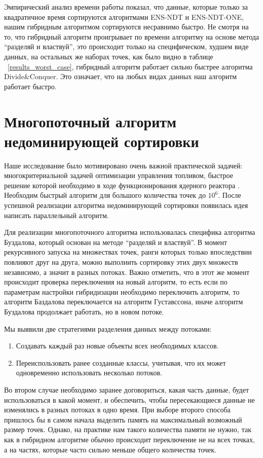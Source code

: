 Эмпирический анализ времени работы показал, что данные, которые только за квадратичное время сортируются алгоритмами ENS-NDT и ENS-NDT-ONE, нашим гибридным алгоритмом сортируются несравнимо быстро. Не смотря на то, что гибридный алгоритм проигрывает по времени алгоритму на основе метода ``разделяй и властвуй'', это происходит только на специфическом, худшем виде данных, на остальных же наборах точек, как было видно в таблице ~\ref{results_worst_case}, гибридный алгоритм работает сильно быстрее алгоритма Divide\&Conquer. Это означает, что на любых видах данных наш алгоритм работает быстро.

\section{Многопоточный алгоритм недоминирующей сортировки}

Наше исследование было мотивировано очень важной практической задачей: многокритериальной задачей оптимизации управления топливом, быстрое решение которой необходимо в ходе функционирования ядерного реактора \cite{Schlunz}. Необходим быстрый алгоритм для большого количества точек до $10^6$. После успешной реализации алгоритма недоминирующей сортировки появилась идея написать параллельный алгоритм. 

Для реализации многопоточного алгоритма использовалась специфика алгоритма Буздалова, который основан на методе ``разделяй и властвуй''.  В момент рекурсивного запуска на множествах точек, ранги которых только впоследствии повлияют друг на друга, можно выполнить сортировку этих двух множеств независимо, а значит в разных потоках. Важно отметить, что в этот же момент происходит проверка переключения на новый алгоритм, то есть если по параметрам настройки гибридизации необходимо переключить алгоритм, то алгоритм Баздалова переключается на алгоритм Густавссона, иначе алгоритм Буздалова продолжает работать, но в новом потоке. 

Мы выявили две стратегиями разделения данных между потоками:
\begin{enumerate}
    \item Создавать каждый раз новые объекты всех необходимых классов.
    \item Переиспользовать ранее созданные классы, учитывая, что их может одновременно использовать несколько потоков.
\end{enumerate}

Во втором случае необходимо заранее договориться, какая часть данные, будет использоваться в какой момент, и обеспечить, чтобы пересекающиеся данные не изменялись в разных потоках в одно время. При выборе второго способа пришлось бы в самом начала выделить память на максимальный возможный размер точек. Однако, на практике нам такого количества памяти не нужно, так как в гибридном алгоритме обычно происходит переключение не на всех точках, а на частях, которые часто сильно меньше общего количества точек.

